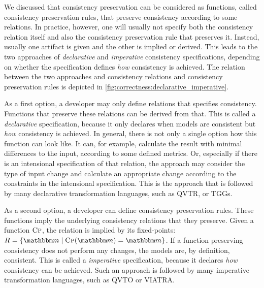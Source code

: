 We discussed that consistency preservation can be considered as functions, called \glspl{consistency preservation rule}, that preserve consistency according to some relations.
In practice, however, one will usually not specify both the \gls{consistency relation} itself and also the \gls{consistency preservation rule} that preserves it.
Instead, usually one artifact is given and the other is implied or derived.
This leads to the two approaches of \emph{declarative} and \emph{imperative} consistency specifications, depending on whether the specification defines \emph{how} consistency is achieved.
The relation between the two approaches and \glspl{consistency relation} and \glspl{consistency preservation rule} is depicted in \autoref{fig:correctness:declarative_imperative}.

As a first option, a developer may only define relations that specifies consistency. Functions that preserve these relations can be derived from that.
This is called a \emph{declarative} specification, because it only declares when models are consistent but \emph{how} consistency is achieved.
In general, there is not only a single option how this function can look like.
It can, for example, calculate the result with minimal differences to the input, according to some defined metrics.
Or, especially if there is an intensional specification of that relation, the approach may consider the type of input change and calculate an appropriate change according to the constraints in the intensional specification.
This is the approach that is followed by many declarative transformation languages, such as \gls{QVTR}, or \glspl{TGG}.

As a second option, a developer can define \glspl{consistency preservation rule}.
These functions imply the underlying \glspl{consistency relation} that they preserve.
Given a function $\textsc{Cp}$, the relation is implied by its fixed-points: $\consistencyrelation{R}{} = \setted{\modelset{m} \mid \function{Cp}(\modelset{m}) = \modelset{m}}$.
If a function preserving consistency does not perform any changes, the models are, by definition, consistent.
This is called a \emph{imperative} specification, because it declares \emph{how} consistency can be achieved.
Such an approach is followed by many imperative transformation languages, such as \gls{QVTO} or \gls{VIATRA}.


